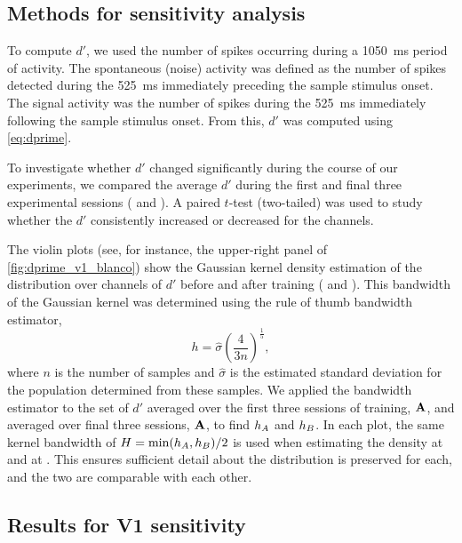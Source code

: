 \subsection{Methods for sensitivity analysis}
\label{sec:violin_plot_method}

To compute $d'$, we used the number of spikes occurring during a \SI{1050}{\milli\second} period of activity.
The spontaneous (noise) activity was defined as the number of spikes detected during the \SI{525}{\milli\second} immediately preceding the sample stimulus onset.
The signal activity was the number of spikes during the \SI{525}{\milli\second} immediately following the sample stimulus onset.
From this, $d'$ was computed using \autoref{eq:dprime}.

To investigate whether $d'$ changed significantly during the course of our experiments, we compared the average $d'$ during the first and final three experimental sessions ( and ).
A paired $t$-test (two-tailed) was used to study whether the $d'$ consistently increased or decreased for the channels.

The violin plots (see, for instance, the upper-right panel of \autoref{fig:dprime_v1_blanco}) show the Gaussian kernel density estimation of the distribution over channels of $d'$ before and after training ( and ).
This bandwidth of the Gaussian kernel was determined using the rule of thumb bandwidth estimator,
\begin{equation}
h = \hat{\sigma} \left( \frac{4}{3 n} \right) ^ \frac{1}{5}
,\label{eq:estimate-bw}\end{equation}
where $n$ is the number of samples and $\hat{\sigma}$ is the estimated standard deviation for the population determined from these samples.
We applied the bandwidth estimator to the set of $d'$ averaged over the first three sessions of training, $\mathbf{A}$, and averaged over final three sessions, $\mathbf{A}$, to find $h_{A}$ and $h_{B}$.
In each plot, the same kernel bandwidth of
$H = \min(h_{A}, h_{B}) / 2$
is used when estimating the density at  and at .
This ensures sufficient detail about the distribution is preserved for each, and the two are comparable with each other.

\subsection{Results for \acs{V1} sensitivity}

